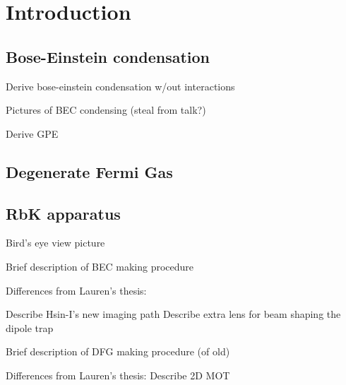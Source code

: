 \renewcommand{\thechapter}{1}

\chapter{Introduction}

\section{Bose-Einstein condensation}

Derive bose-einstein condensation w/out interactions

Pictures of BEC condensing (steal from talk?)

Derive GPE

\section{Degenerate Fermi Gas}


\section{RbK apparatus}

Bird's eye view picture

Brief description of BEC making procedure

Differences from Lauren's thesis:

    Describe Hsin-I's new imaging path
    Describe extra lens for beam shaping the dipole trap

Brief description of DFG making procedure (of old)

Differences from Lauren's thesis:
	    Describe 2D MOT